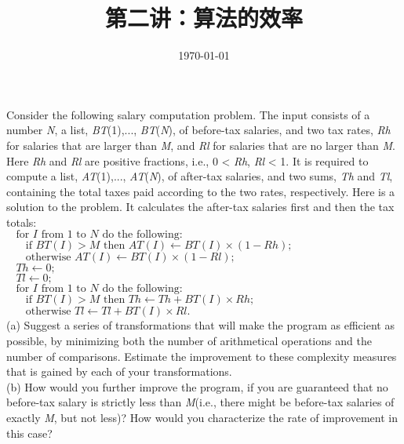 \documentclass[11pt, a4paper, UTF8]{ctexart}
\title{第二讲：算法的效率}
\date{\today}     %
\begin{document}
\maketitle
\noplagiarism	%
\beginthishw	%

\begin{problem}[DH: 6.1]	%
  Consider the following salary computation problem. The input consists of a number \textsl{N}, 
  a list, \textsl{BT}(1),..., \textsl{BT}(\textsl{N}), of before-tax salaries, and two 
  tax rates, \textsl{Rh} for salaries that are larger than \textsl{M}, and \textsl{Rl} 
  for salaries that are no larger than \textsl{M}. Here \textsl{Rh} and \textsl{Rl} are 
  positive fractions, i.e., 0 < \textsl{Rh}, \textsl{Rl} < 1. It is required to compute 
  a list, \textsl{AT}(1),..., \textsl{AT}(\textsl{N}), of after-tax salaries, and two 
  sums, \textsl{Th} and \textsl{Tl}, containing the total taxes paid according to the 
  two rates, respectively. Here is a solution to the problem. It calculates the after-tax 
  salaries first and then the tax totals:\\
  $~~~~\text{for } I \text{ from 1 to } N \text{ do the following:}$\\
  $~~~~~~~~\text{if } BT(I) > M \text{ then } AT(I) \gets BT(I) \times (1 - Rh);$\\
  $~~~~~~~~\text{otherwise } AT(I) \gets BT(I) \times (1 - Rl);$\\
  $~~~~Th \gets 0;$\\
  $~~~~Tl \gets 0;$\\
  $~~~~\text{for } I \text{ from 1 to } N \text{ do the following:}$\\
  $~~~~~~~~\text{if } BT(I) > M \text{ then } Th \gets Th + BT(I) \times Rh;$\\
  $~~~~~~~~\text{otherwise } Tl \gets Tl + BT(I) \times Rl.$\\
  (a) Suggest a series of transformations that will make the program as efficient as 
  possible, by minimizing both the number of arithmetical operations and the number of 
  comparisons. Estimate the improvement to these complexity measures that is gained by 
  each of your transformations.\\
  (b) How would you further improve the program, if you are guaranteed that no before-tax 
  salary is strictly less than \textsl{M}(i.e., there might be before-tax salaries of 
  exactly \textsl{M}, but not less)? How would you characterize the rate of improvement 
  in this case?
\end{problem}
\end{document}

